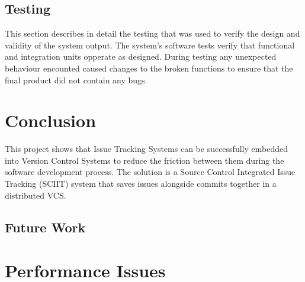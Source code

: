 \documentclass{mproj}
\begin{document}
\section{Testing} %

This section describes in detail the testing that was used to verify the design and validity of the system output. The system's software tests verify that functional and integration units opperate as designed. During testing any unexpected behaviour encounted caused changes to the broken functions to ensure that the final product did not contain any bugs.

\chapter{Conclusion}\label{conclusion}

This project shows that Issue Tracking Systems can be successfully embedded into Version Control Systems to reduce the friction between them during the software development process. The solution is a Source Control Integrated Issue Tracking (SCIIT) system that saves issues alongside commits together in a distributed VCS.

\section{Future Work}




\appendix %
\chapter{Performance Issues}


\end{document}
